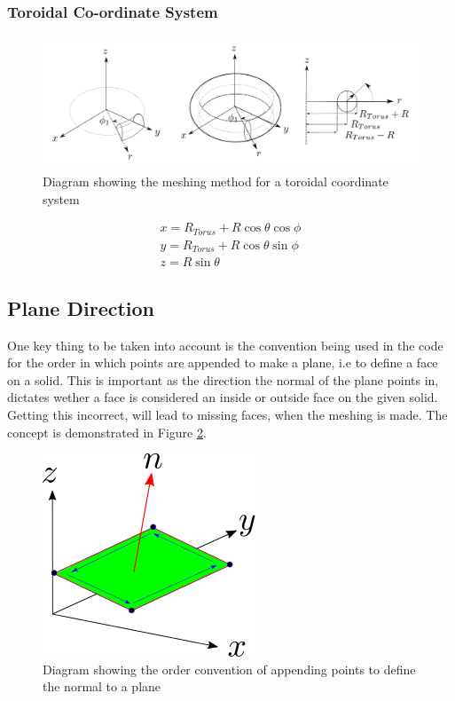 \documentclass[12pt,a4paper]{article}
\begin{document}
\subsubsection{Toroidal Co-ordinate System}
\begin{figure}[h!]
\centering
\includegraphics[scale=0.35]{Images//Coords/torus_coords.png}
\caption[width=\columnwidth]{Diagram showing the meshing method for a toroidal coordinate system}
\label{conts}
\end{figure}

\begin{equation}
\begin{split}
x = R_{Torus} + R\cos{\theta}\cos{\phi} \\
y = R_{Torus} + R\cos{\theta}\sin{\phi} \\
z =  R\sin{\theta}
\end{split}
\end{equation}

\subsection{Plane Direction}
One key thing to be taken into account is the convention being used in the code for the order in which points are appended to make a plane, i.e to define a face on a solid. This is important as the direction the normal of the plane points in, dictates wether a face is considered an inside or outside face on the given solid. Getting this incorrect, will lead to missing faces, when the meshing is made. The concept is demonstrated in Figure \ref{pointsorder}.

\begin{figure}[h!]
\centering
\includegraphics[scale=0.75]{Images//append_points//Point_Appending_Order.png}
\caption[width=\columnwidth]{Diagram showing the order convention of appending points to define the normal to a plane}
\label{pointsorder}
\end{figure}
 
\end{document}
